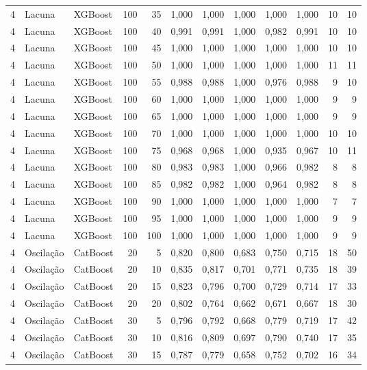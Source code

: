 \begin{longtable}{@{}rllrrrrrrrrr@{}}
4 & Lacuna & XGBoost & 100 & 35 & 1,000 & 1,000 & 1,000 & 1,000 & 1,000 & 10 & 10 \\
4 & Lacuna & XGBoost & 100 & 40 & 0,991 & 0,991 & 1,000 & 0,982 & 0,991 & 10 & 10 \\
4 & Lacuna & XGBoost & 100 & 45 & 1,000 & 1,000 & 1,000 & 1,000 & 1,000 & 10 & 10 \\
4 & Lacuna & XGBoost & 100 & 50 & 1,000 & 1,000 & 1,000 & 1,000 & 1,000 & 11 & 11 \\
4 & Lacuna & XGBoost & 100 & 55 & 0,988 & 0,988 & 1,000 & 0,976 & 0,988 & 9 & 10 \\
4 & Lacuna & XGBoost & 100 & 60 & 1,000 & 1,000 & 1,000 & 1,000 & 1,000 & 9 & 9 \\
4 & Lacuna & XGBoost & 100 & 65 & 1,000 & 1,000 & 1,000 & 1,000 & 1,000 & 9 & 9 \\
4 & Lacuna & XGBoost & 100 & 70 & 1,000 & 1,000 & 1,000 & 1,000 & 1,000 & 10 & 10 \\
4 & Lacuna & XGBoost & 100 & 75 & 0,968 & 0,968 & 1,000 & 0,935 & 0,967 & 10 & 11 \\
4 & Lacuna & XGBoost & 100 & 80 & 0,983 & 0,983 & 1,000 & 0,966 & 0,982 & 8 & 8 \\
4 & Lacuna & XGBoost & 100 & 85 & 0,982 & 0,982 & 1,000 & 0,964 & 0,982 & 8 & 8 \\
4 & Lacuna & XGBoost & 100 & 90 & 1,000 & 1,000 & 1,000 & 1,000 & 1,000 & 7 & 7 \\
4 & Lacuna & XGBoost & 100 & 95 & 1,000 & 1,000 & 1,000 & 1,000 & 1,000 & 9 & 9 \\
4 & Lacuna & XGBoost & 100 & 100 & 1,000 & 1,000 & 1,000 & 1,000 & 1,000 & 9 & 9 \\
4 & Oscilação & CatBoost & 20 & 5 & 0,820 & 0,800 & 0,683 & 0,750 & 0,715 & 18 & 50 \\
4 & Oscilação & CatBoost & 20 & 10 & 0,835 & 0,817 & 0,701 & 0,771 & 0,735 & 18 & 39 \\
4 & Oscilação & CatBoost & 20 & 15 & 0,823 & 0,796 & 0,700 & 0,729 & 0,714 & 17 & 33 \\
4 & Oscilação & CatBoost & 20 & 20 & 0,802 & 0,764 & 0,662 & 0,671 & 0,667 & 18 & 30 \\
4 & Oscilação & CatBoost & 30 & 5 & 0,796 & 0,792 & 0,668 & 0,779 & 0,719 & 17 & 42 \\
4 & Oscilação & CatBoost & 30 & 10 & 0,816 & 0,809 & 0,697 & 0,790 & 0,740 & 17 & 35 \\
4 & Oscilação & CatBoost & 30 & 15 & 0,787 & 0,779 & 0,658 & 0,752 & 0,702 & 16 & 34 \\

\end{longtable}
